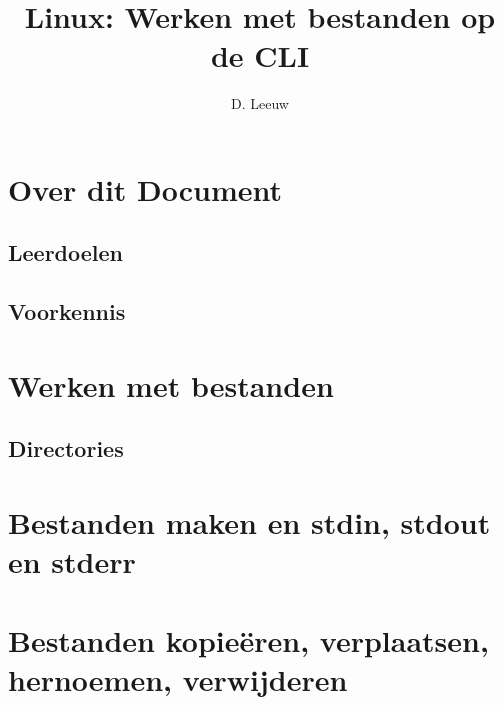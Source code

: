 \documentclass[a4paper,12pt,twoside,openright,titlepage]{article}
\author{D. Leeuw}
\title{Linux: Werken met bestanden op de CLI}
\date{\today\\v.0.9.5\\
\vfill
\raggedright
\copyright\ 2020-2025 Dennis Leeuw\\
}
\begin{document}

\maketitle


\section{Over dit Document}
\subsection{Leerdoelen}

\subsection{Voorkennis}



\section{Werken met bestanden}

\subsection{Directories}


\section{Bestanden maken en stdin, stdout en stderr}

\section{Bestanden kopie\"eren, verplaatsen, hernoemen, verwijderen}


\printindex
\end{document}
